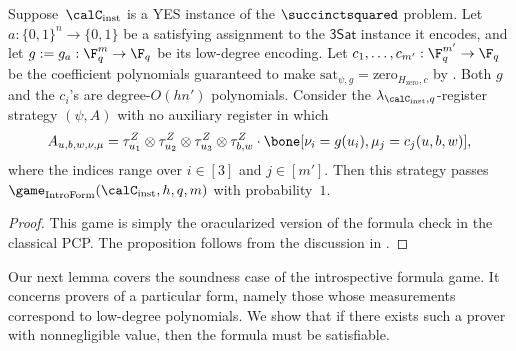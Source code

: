 \begin{proposition}\label{prop:formula-game-completeness}
Suppose~$\calC_{\mathrm{inst}}$ is a YES instance of the $\succinctsquared$ problem.
Let $a:\{0,1\}^n \rightarrow \{0, 1\}$ be a satisfying assignment to the $\mathsf{3Sat}$ instance it encodes,
and let $g:=g_a:\F_q^m \rightarrow \F_q$ be its low-degree encoding.
Let $c_1, \ldots, c_{m'}:\F_q^{m'} \rightarrow \F_q$ be the coefficient polynomials guaranteed to make 
$\mathrm{sat}_{\psi, g} = \mathrm{zero}_{H_{\mathrm{zero}}, c}$ by .
Both $g$ and the $c_i$'s are degree-$O(hn')$ polynomials.
Consider the $\lambda_{\calC_{\mathrm{inst}},q}$-register strategy $(\psi, A)$ with no auxiliary register in which
\begin{equation*}
A_{u, b, w, \nu, \mu} =  \tau^Z_{u_1} \otimes \tau^Z_{u_2} \otimes \tau^Z_{u_3} \otimes \tau^Z_{b, w}  \cdot \bone[\nu_i = g(u_i), \mu_j = c_j(u, b, w)],
\end{equation*}
where the indices range over $i \in [3]$ and $j \in [m']$.
Then this strategy passes $\game_{\mathrm{IntroForm}}(\calC_{\mathrm{inst}}, h, q, m)$ with probability~$1$.
\end{proposition}
\begin{proof}
This game is simply the oracularized version of the formula check in the classical PCP.
The proposition follows from the discussion in .
\end{proof}

Our next lemma covers the soundness case of the introspective formula game.
It concerns provers of a particular form,
namely those whose measurements correspond to low-degree polynomials.
We show that if there exists such a prover with nonnegligible value, then the formula must be satisfiable.

